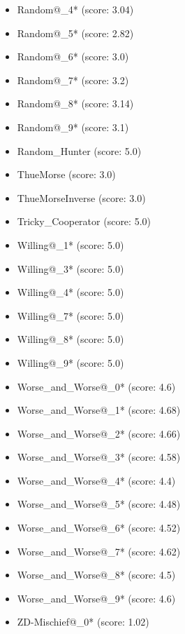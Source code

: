 \begin{appendices}
\begin{itemize}
\begin{multicols}{3}
\begin{itemize}
            \item Random@\_4* (score: 3.04)
            \item Random@\_5* (score: 2.82)
            \item Random@\_6* (score: 3.0)
            \item Random@\_7* (score: 3.2)
            \item Random@\_8* (score: 3.14)
            \item Random@\_9* (score: 3.1)
            \item Random\_Hunter (score: 5.0)
            \item ThueMorse (score: 3.0)
            \item ThueMorseInverse (score: 3.0)
            \item Tricky\_Cooperator (score: 5.0)
            \item Willing@\_1* (score: 5.0)
            \item Willing@\_3* (score: 5.0)
            \item Willing@\_4* (score: 5.0)
            \item Willing@\_7* (score: 5.0)
            \item Willing@\_8* (score: 5.0)
            \item Willing@\_9* (score: 5.0)
            \item Worse\_and\_Worse@\_0* (score: 4.6)
            \item Worse\_and\_Worse@\_1* (score: 4.68)
            \item Worse\_and\_Worse@\_2* (score: 4.66)
            \item Worse\_and\_Worse@\_3* (score: 4.58)
            \item Worse\_and\_Worse@\_4* (score: 4.4)
            \item Worse\_and\_Worse@\_5* (score: 4.48)
            \item Worse\_and\_Worse@\_6* (score: 4.52)
            \item Worse\_and\_Worse@\_7* (score: 4.62)
            \item Worse\_and\_Worse@\_8* (score: 4.5)
            \item Worse\_and\_Worse@\_9* (score: 4.6)
            \item ZD-Mischief@\_0* (score: 1.02)
        \end{itemize}
     \end{multicols}
     
    \end{itemize}
    

\end{appendices}
